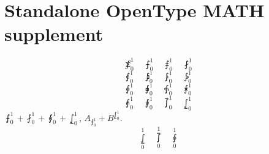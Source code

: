 \documentclass{article}
\begin{document}
\section*{Standalone OpenType MATH supplement}
\[
  \sumint_0^1\quad\intbar_0^1\quad\intBar_0^1\quad\fint_0^1
\]
\[
  \cirfnint_0^1\quad\rppolint_0^1\quad\scpolint_0^1\quad\npolint_0^1
\]
\[
  \pointint_0^1\quad\sqint_0^1\quad\intlarhk_0^1\quad\intx_0^1
\]
\[
  \intcap_0^1\quad\intcup_0^1\quad\upint_0^1\quad\lowint_0^1
\]
$\intbar_0^1+\fint_0^1+\pointint_0^1+\lowint_0^1$,
$A_{\intbar_0^1}+B^{\lowint_0^1}$.
\[
  \lowint\limits_0^1\quad\upint\limits_0^1\quad\pointint\limits_0^1
\]
\end{document}
